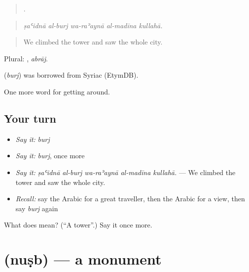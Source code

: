 \begin{quote}
    .
\end{quote}

\begin{quote}
\emph{ṣaʿidnā al-burj wa-raʾaynā al-madīna kullahā.}
\end{quote}

\begin{quote}
We climbed the tower and saw the whole city.
\end{quote}

Plural: , \emph{abrāj}.

\begin{cousinweb}
\textbf{} (\emph{burj}) was borrowed from Syriac (EtymDB).
\end{cousinweb}

\begin{grammarlens}[title={What you've built}]
One more word for getting around.
\end{grammarlens}

\subsection*{Your turn}
\begin{itemize}
\raggedright
  \item \emph{Say it:} \emph{burj}
  \item \emph{Say it:} \emph{burj}, once more
  \item \emph{Say it:} \emph{ṣaʿidnā al-burj wa-raʾaynā al-madīna kullahā.} — We climbed the tower and saw the whole city.
  \item \emph{Recall:} say the Arabic for a great traveller, then the Arabic for a view, then say \emph{burj} again
\end{itemize}

\begin{tcolorbox}[breakable,colback=teal!4,colframe=teal!35!black,title={Before you move on}]
What does  mean? (\textquotedblleft{}A tower\textquotedblright{}.) Say it once more.
\end{tcolorbox}
\section[\texorpdfstring{\ar{نصب} (nuṣb)}{نصب (nuṣb)}]{ (nuṣb) — a monument}

\label{lesson:AR-C439-nusb}



